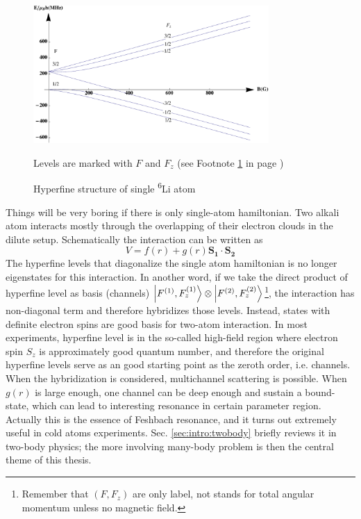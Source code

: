 \begin{figure}[htbp]
\begin{center}
\includegraphics[width=0.8\textwidth]{hyperfineLi6}
\caption{Hyperfine structure of single \textsuperscript{6}Li atom } 
Levels are marked with $F$ and $F_{z}$ {(see Footnote \ref{foot:intro:f} in page \pageref{foot:intro:f})}
\label{fig:intro:li6}
\end{center}
\end{figure}



Things will be very boring if there is only single-atom hamiltonian.  Two alkali atom interacts mostly through the overlapping of their electron clouds in the dilute setup.  Schematically the interaction can be written as 
\begin{equation}\label{eq:intro:two}
V=f(r)+g(r)\mathbf{S_{1}}\cdot\mathbf{S_{2}}
\end{equation}
The hyperfine levels that diagonalize the single atom hamiltonian is no longer eigenstates for this interaction.  In another word, if we take the direct product of hyperfine level as basis (channels) $\left|F^{(1)},F_{z}^{(1)}\right>\otimes\left|F^{(2)},F_{z}^{(2)}\right>$\footnote{Remember that $(F,F_{z})$ are only label, not stands for total angular momentum unless no magnetic field.\label{foot:intro:f}}, the interaction has non-diagonal term and therefore hybridizes those levels. Instead, states with definite electron spins are good basis for two-atom interaction.  In most experiments, hyperfine level is in the so-called high-field region where electron spin $S_z$ is approximately good quantum number, and therefore the original hyperfine levels serve as an good starting point as the zeroth order, i.e. channels.  When the hybridization is considered, multichannel scattering is possible.  When $g(r)$ is large enough, one channel can be deep enough and sustain a bound-state, which can lead to interesting resonance in certain parameter region.   Actually this is the essence of Feshbach resonance, and it turns out extremely useful in   cold atoms experiments.  Sec. \ref{sec:intro:twobody} briefly reviews it in two-body physics; the more involving many-body problem is then the central theme of this thesis. 

